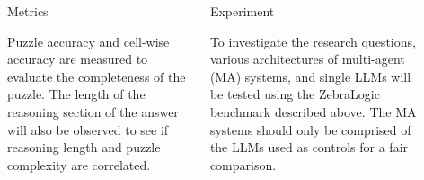 \documentclass[final]{beamer}
\newlength{\sepwid}
\newlength{\onecolwid}
\newlength{\twocolwid}
\begin{document}
\begin{frame}[t]
\begin{columns}[t]
\begin{column}{\twocolwid}
\begin{columns}[t,totalwidth=\twocolwid]
\begin{column}{\onecolwid}
\begin{block}{Metrics}

    Puzzle accuracy and cell-wise accuracy are measured to evaluate the completeness of the puzzle. 
    The length of the reasoning section of the answer will also be observed to see if reasoning length and puzzle complexity are correlated. 

\end{block}


\end{column} %

\begin{column}{\onecolwid} %


\begin{block}{Experiment}

    To investigate the research questions, various architectures of multi-agent (MA) systems, and single LLMs will be tested using the ZebraLogic benchmark described above. The MA systems should only be comprised of the LLMs used as controls for a fair comparison. 

\end{block}


\end{column} %

\end{columns} %

\end{column} %

\begin{column}{\sepwid}\end{column} %

\begin{column}{\onecolwid} %



\end{column}
\end{columns}
\end{frame}
\end{document}
